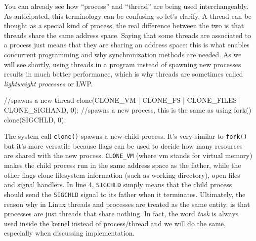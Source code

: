 \documentclass[10pt]{book}
\begin{document}
You can already see how ``process'' and ``thread'' are being used interchangeably. As anticipated, this terminology can be confusing so let's clarify. A thread can be thought as a special kind of process, the real difference between the two is that threads share the same address space. Saying that some threads are associated to a process just means that they are sharing an address space: this is what enables concurrent programming and why synchronization methods are needed. As we will see shortly, using threads in a program instead of spawning new processes results in much better performance, which is why threads are sometimes called \textit{lightweight processes} or LWP. %
\begin{code}
//spawns a new thread
clone(CLONE_VM | CLONE_FS | CLONE_FILES | CLONE_SIGHAND, 0); 
//spawns a new process, this is the same as using fork()
clone(SIGCHLD, 0); 
\end{code}
The system call \verb|clone()| spawns a new child process. It's very similar to \verb|fork()| but it's more versatile because flags can be used to decide how many resources are shared with the new process. \verb|CLONE_VM| (where vm stands for virtual memory) makes the child process run in the same address space as the father, while the other flags clone filesystem information (such as working directory), open files and signal handlers. In line 4, \verb|SIGCHLD| simply means that the child process should send the \verb|SIGCHLD| signal to its father when it terminates. Ultimately, the reason why in Linux threads and processes are treated as the same entity, is that processes are just threads that share nothing. In fact, the word \textit{task} is always used inside the kernel instead of process/thread and we will do the same, especially when discussing implementation.
\end{document}
